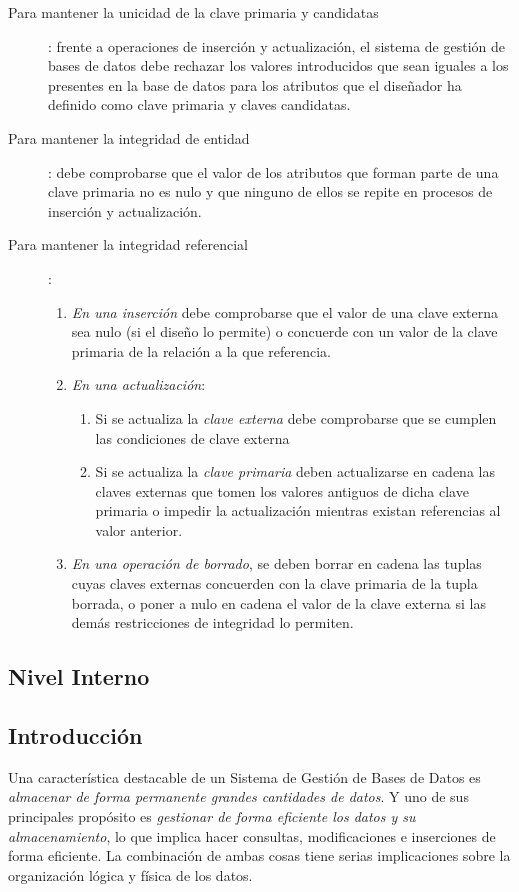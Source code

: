 \documentclass[10pt,a4paper,spanish]{report}
\begin{document}
\begin{description}
    \item[Para mantener la unicidad de la clave primaria y candidatas]: frente a operaciones de inserción y actualización, el sistema de gestión de bases de datos debe rechazar los valores introducidos que sean iguales a los presentes en la base de datos para los atributos que el diseñador ha definido como clave primaria y claves candidatas. 
    \item[Para mantener la integridad de entidad]: debe comprobarse que el valor de los atributos que forman parte de una clave primaria no es nulo y que ninguno de ellos se repite en procesos de inserción y actualización.
    \item[Para mantener la integridad referencial]:
    \begin{enumerate}[$\heartsuit$]
        \item \textit{\textcolor[rgb]{1,0.2,0.3}{En una inserción}} debe comprobarse que el valor de una clave externa sea nulo (si el diseño lo permite) o concuerde con un valor de la clave primaria de la relación a la que referencia.
        \item \textcolor[rgb]{1,0.2,0.3}{\textit{En una actualización}}:
        \begin{enumerate}[$\longrightarrow$]
            \item Si se actualiza la \textit{\textcolor[rgb]{1,0.2,0.3}{clave externa}} debe comprobarse que se cumplen las condiciones de clave externa
            \item Si se actualiza la \textit{\textcolor[rgb]{1,0.2,0.3}{clave primaria}} deben actualizarse en cadena las claves externas que tomen los valores antiguos de dicha clave primaria o impedir la actualización mientras existan referencias al valor anterior.
        \end{enumerate}
        \item \textcolor[rgb]{1,0.2,0.3}{\textit{En una operación de borrado}}, se deben borrar en cadena las tuplas cuyas claves externas concuerden con la clave primaria de la tupla borrada, o poner a nulo en cadena el valor de la clave externa si las demás restricciones de integridad lo permiten.
    \end{enumerate}
\end{description}

\textcolor[rgb]{1,0.2,0.3}{\chapter{Nivel Interno}}
\textcolor[rgb]{1,0.2,0.3}{\section{Introducción}}
Una característica destacable de un Sistema de Gestión de Bases de Datos es \textit{\textcolor[rgb]{1,0.2,0.3}{almacenar de forma permanente grandes cantidades de datos}}. Y uno de sus principales propósito es \textit{\textcolor[rgb]{1,0.2,0.3}{gestionar de forma eficiente los datos y su almacenamiento}}, lo que implica hacer consultas, modificaciones e inserciones de forma eficiente. La combinación de ambas cosas tiene serias implicaciones sobre la organización lógica y física de los datos.
\end{document}
